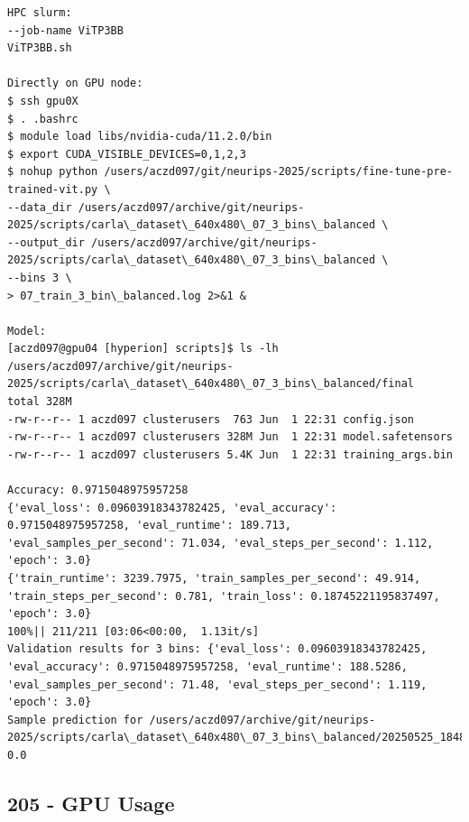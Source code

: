\begin{verbatim}
HPC slurm:
--job-name ViTP3BB
ViTP3BB.sh

Directly on GPU node:
$ ssh gpu0X
$ . .bashrc
$ module load libs/nvidia-cuda/11.2.0/bin
$ export CUDA_VISIBLE_DEVICES=0,1,2,3
$ nohup python /users/aczd097/git/neurips-2025/scripts/fine-tune-pre-trained-vit.py \
--data_dir /users/aczd097/archive/git/neurips-2025/scripts/carla\_dataset\_640x480\_07_3_bins\_balanced \
--output_dir /users/aczd097/archive/git/neurips-2025/scripts/carla\_dataset\_640x480\_07_3_bins\_balanced \
--bins 3 \
> 07_train_3_bin\_balanced.log 2>&1 &

Model:
[aczd097@gpu04 [hyperion] scripts]$ ls -lh /users/aczd097/archive/git/neurips-2025/scripts/carla\_dataset\_640x480\_07_3_bins\_balanced/final
total 328M
-rw-r--r-- 1 aczd097 clusterusers  763 Jun  1 22:31 config.json
-rw-r--r-- 1 aczd097 clusterusers 328M Jun  1 22:31 model.safetensors
-rw-r--r-- 1 aczd097 clusterusers 5.4K Jun  1 22:31 training_args.bin

Accuracy: 0.9715048975957258
{'eval_loss': 0.09603918343782425, 'eval_accuracy': 0.9715048975957258, 'eval_runtime': 189.713, 'eval_samples_per_second': 71.034, 'eval_steps_per_second': 1.112, 'epoch': 3.0}
{'train_runtime': 3239.7975, 'train_samples_per_second': 49.914, 'train_steps_per_second': 0.781, 'train_loss': 0.18745221195837497, 'epoch': 3.0}
100%|| 211/211 [03:06<00:00,  1.13it/s]
Validation results for 3 bins: {'eval_loss': 0.09603918343782425, 'eval_accuracy': 0.9715048975957258, 'eval_runtime': 188.5286, 'eval_samples_per_second': 71.48, 'eval_steps_per_second': 1.119, 'epoch': 3.0}
Sample prediction for /users/aczd097/archive/git/neurips-2025/scripts/carla\_dataset\_640x480\_07_3_bins\_balanced/20250525_184825_325030_steering_0.0000.jpg: 0.0

\end{verbatim}

\subsection{205 - GPU Usage}
\label{app_res:205}

